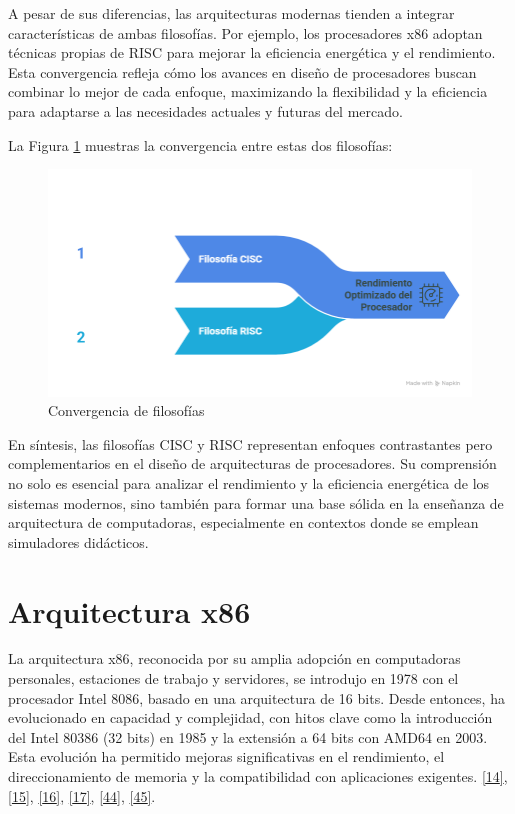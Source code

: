 \documentclass[12pt,oneside]{templates/unerthesis}
\begin{document}
A pesar de sus diferencias, las arquitecturas modernas tienden a integrar características de ambas filosofías. Por ejemplo, los procesadores x86 adoptan técnicas propias de RISC para mejorar la eficiencia energética y el rendimiento. Esta convergencia refleja cómo los avances en diseño de procesadores buscan combinar lo mejor de cada enfoque, maximizando la flexibilidad y la eficiencia para adaptarse a las necesidades actuales y futuras del mercado.

La Figura \ref{fig:convergen} muestras la convergencia entre estas dos filosofías:

\begin{figure}

{\centering \includegraphics[width=1\linewidth]{images/convergen} 

}

\caption{Convergencia de filosofías}\label{fig:convergen}
\end{figure}

En síntesis, las filosofías CISC y RISC representan enfoques contrastantes pero complementarios en el diseño de arquitecturas de procesadores. Su comprensión no solo es esencial para analizar el rendimiento y la eficiencia energética de los sistemas modernos, sino también para formar una base sólida en la enseñanza de arquitectura de computadoras, especialmente en contextos donde se emplean simuladores didácticos.

\hypertarget{arquitectura-x86-1}{%
\section{Arquitectura x86}\label{arquitectura-x86-1}}

La arquitectura x86, reconocida por su amplia adopción en computadoras personales, estaciones de trabajo y servidores, se introdujo en 1978 con el procesador Intel 8086, basado en una arquitectura de 16 bits. Desde entonces, ha evolucionado en capacidad y complejidad, con hitos clave como la introducción del Intel 80386 (32 bits) en 1985 y la extensión a 64 bits con AMD64 en 2003. Esta evolución ha permitido mejoras significativas en el rendimiento, el direccionamiento de memoria y la compatibilidad con aplicaciones exigentes. \protect\hyperlink{ref-stallings_computer_2021}{{[}14{]}}, \protect\hyperlink{ref-intel_64_2025}{{[}15{]}}, \protect\hyperlink{ref-amd_developer_2024}{{[}16{]}}, \protect\hyperlink{ref-abel_ibm_2000}{{[}17{]}}, \protect\hyperlink{ref-brey_intel_microprocessors}{{[}44{]}}, \protect\hyperlink{ref-intel8086manual}{{[}45{]}}.
\end{document}
